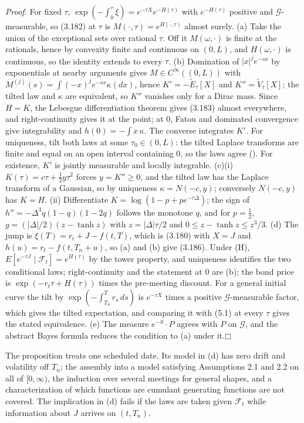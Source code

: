 \documentclass[11pt]{article}
\providecommand{\square}{\mdlgwhtsquare}
\begin{document}
\emph{Proof.} For fixed \(\tau\), \(\exp(-\int_0^\tau\xi)=e^{-\tau X}e^{-H(\tau)}\) with \(e^{-H(\tau)}\) positive and \(\mathcal G\)-measurable, so (3.182) at \(\tau\) is \(M(\cdot,\tau)=e^{H(\cdot,\tau)}\) almost surely. (a) Take the union of the exceptional sets over rational \(\tau\). Off it \(M(\omega,\cdot)\) is finite at the rationals, hence by convexity finite and continuous on \((0,L)\), and \(H(\omega,\cdot)\) is continuous, so the identity extends to every \(\tau\). (b) Domination of \(|x|^je^{-sx}\) by exponentials at nearby arguments gives \(M\in C^\infty((0,L))\) with \(M^{(j)}(s)=\int(-x)^je^{-sx}\kappa(dx)\), hence \(K'=-\tilde E_\tau[X]\) and \(K''=\tilde V_\tau[X]\); the tilted law and \(\kappa\) are equivalent, so \(K''\) vanishes only for a Dirac mass. Since \(H=K\), the Lebesgue differentiation theorem gives (3.183) almost everywhere, and right-continuity gives it at the point; at \(0\), Fatou and dominated convergence give integrability and \(h(0)=-\int x\,\kappa\). The converse integrates \(K'\). For uniqueness, tilt both laws at some \(\tau_0\in(0,L)\): the tilted Laplace transforms are finite and equal on an open interval containing \(0\), so the laws agree (\cite{curtiss1942note}). For existence, \(K'\) is jointly measurable and locally integrable. (c)(i) \(K(\tau)=c\tau+\tfrac12y\tau^2\) forces \(y=K''\ge0\), and the tilted law has the Laplace transform of a Gaussian, so by uniqueness \(\kappa=N(-c,y)\); conversely \(N(-c,y)\) has \(K=H\). (ii) Differentiate \(K=\log(1-p+pe^{-\tau\Delta})\); the sign of \(h''=-\Delta^3q(1-q)(1-2q)\) follows the monotone \(q\), and for \(p=\tfrac12\), \(g=(|\Delta|/2)(z-\tanh z)\) with \(z=|\Delta|\tau/2\) and \(0\le z-\tanh z\le z^3/3\). (d) The jump is \(\xi(T)=r_t+J-f(t,T)\), which is (3.180) with \(X=J\) and \(h(u)=r_t-f(t,T_n+u)\), so (a) and (b) give (3.186). Under (H), \(E[e^{-\tau J}\mid\mathcal F_t]=e^{H(\tau)}\) by the tower property, and uniqueness identifies the two conditional laws; right-continuity and the statement at \(0\) are (b); the bond price is \(\exp(-r_t\tau+H(\tau))\) times the pre-meeting discount. For a general initial curve the tilt by \(\exp(-\int_{T_n}^Tr_s\,ds)\) is \(e^{-\tau X}\) times a positive \(\mathcal G\)-measurable factor, which gives the tilted expectation, and comparing it with (5.1) at every \(\tau\) gives the stated equivalence. (e) The measure \(e^{-S}\cdot P\) agrees with \(P\) on \(\mathcal G\), and the abstract Bayes formula reduces the condition to (a) under it.\hfill$\square$

The proposition treats one scheduled date. Its model in (d) has zero drift and volatility off \(T_n\); the assembly into a model satisfying Assumptions 2.1 and 2.2 on all of \([0,\infty)\), the induction over several meetings for general shapes, and a characterization of which functions are cumulant generating functions are not covered. The implication in (d) fails if the laws are taken given \(\mathcal F_t\) while information about \(J\) arrives on \((t,T_n)\).
\end{document}
